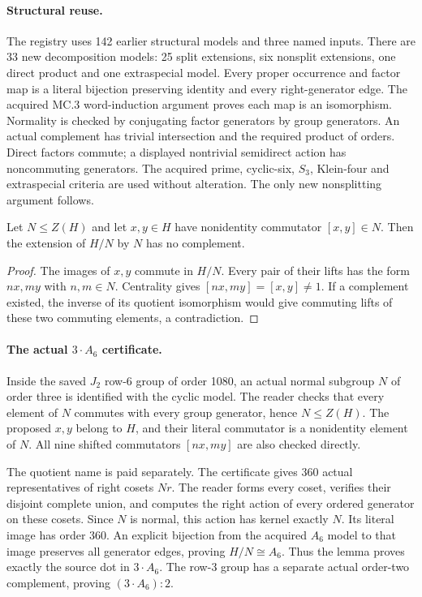 \documentclass[11pt]{article}
\begin{document}
\paragraph{Structural reuse.}
The registry uses 142 earlier structural models and three named inputs.
There are 33 new decomposition models: 25 split extensions, six nonsplit
extensions, one direct product and one extraspecial model.
Every proper occurrence and factor map is a literal bijection preserving
identity and every right-generator edge. The acquired MC.3 word-induction
argument proves each map is an isomorphism. Normality is checked by
conjugating factor generators by group generators. An actual complement
has trivial intersection and the required product of orders. Direct factors
commute; a displayed nontrivial semidirect action has noncommuting generators.
The acquired prime, cyclic-six, $S_3$, Klein-four and extraspecial criteria
are used without alteration. The only new nonsplitting argument follows.

\newpage
\begin{lemma}
Let $N\leq Z(H)$ and let $x,y\in H$ have nonidentity commutator
$[x,y]\in N$. Then the extension of $H/N$ by $N$ has no complement.
\end{lemma}
\begin{proof}
The images of $x,y$ commute in $H/N$. Every pair of their lifts has the
form $nx,my$ with $n,m\in N$. Centrality gives
$[nx,my]=[x,y]\ne1$. If a complement existed, the inverse of its quotient
isomorphism would give commuting lifts of these two commuting elements,
a contradiction.
\end{proof}

\paragraph{The actual $3\mathbin{\cdot}A_6$ certificate.}
Inside the saved $J_2$ row-6 group of order 1080, an actual normal subgroup
$N$ of order three is identified with the cyclic model. The reader checks
that every element of $N$ commutes with every group generator, hence
$N\leq Z(H)$. The proposed $x,y$ belong to $H$, and their literal
commutator is a nonidentity element of $N$. All nine shifted commutators
$[nx,my]$ are also checked directly.

The quotient name is paid separately. The certificate gives 360 actual
representatives of right cosets $Nr$. The reader forms every coset, verifies
their disjoint complete union, and computes the right action of every
ordered generator on these cosets. Since $N$ is normal, this action has
kernel exactly $N$. Its literal image has order 360. An explicit bijection
from the acquired $A_6$ model to that image preserves all generator edges,
proving $H/N\cong A_6$. Thus the lemma proves exactly the source dot in
$3\mathbin{\cdot}A_6$. The row-3 group has a separate actual order-two
complement, proving $(3\mathbin{\cdot}A_6):2$.
\end{document}
